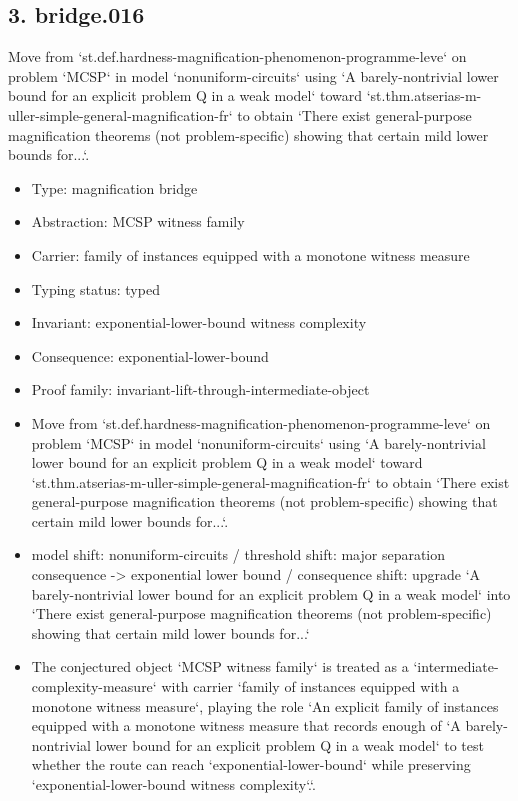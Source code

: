 \documentclass[11pt]{article}
\begin{document}
\subsection*{3. bridge.016}
Move from `st.def.hardness-magnification-phenomenon-programme-leve` on problem `MCSP` in model `nonuniform-circuits` using `A barely-nontrivial lower bound for an explicit problem Q in a weak model` toward `st.thm.atserias-m-uller-simple-general-magnification-fr` to obtain `There exist general-purpose magnification theorems (not problem-specific) showing that certain mild lower bounds for...`.
\begin{itemize}
\item Type: magnification bridge
\item Abstraction: MCSP witness family
\item Carrier: family of instances equipped with a monotone witness measure
\item Typing status: typed
\item Invariant: exponential-lower-bound witness complexity
\item Consequence: exponential-lower-bound
\item Proof family: invariant-lift-through-intermediate-object
\item Move from `st.def.hardness-magnification-phenomenon-programme-leve` on problem `MCSP` in model `nonuniform-circuits` using `A barely-nontrivial lower bound for an explicit problem Q in a weak model` toward `st.thm.atserias-m-uller-simple-general-magnification-fr` to obtain `There exist general-purpose magnification theorems (not problem-specific) showing that certain mild lower bounds for...`.
\item model shift: nonuniform-circuits / threshold shift: major separation consequence -> exponential lower bound / consequence shift: upgrade `A barely-nontrivial lower bound for an explicit problem Q in a weak model` into `There exist general-purpose magnification theorems (not problem-specific) showing that certain mild lower bounds for...`
\item The conjectured object `MCSP witness family` is treated as a `intermediate-complexity-measure` with carrier `family of instances equipped with a monotone witness measure`, playing the role `An explicit family of instances equipped with a monotone witness measure that records enough of `A barely-nontrivial lower bound for an explicit problem Q in a weak model` to test whether the route can reach `exponential-lower-bound` while preserving `exponential-lower-bound witness complexity`.`.

\end{itemize}
\end{document}
